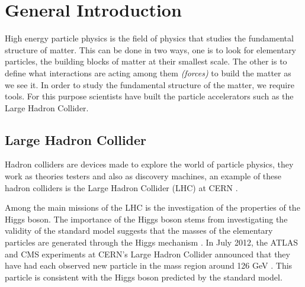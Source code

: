 \chapter{General Introduction}




High energy particle physics is the field of physics that studies the fundamental structure of matter. This can be done in two ways, one is to look for elementary particles, the building blocks of matter at their smallest scale. The other is to define what interactions are acting among them
\emph{(forces)} to build the matter as we see it. In order to study the fundamental structure of the matter, we require tools. For this purpose scientists have built the particle accelerators such as the Large Hadron Collider.



\section{Large Hadron Collider}



Hadron colliders are devices made to explore the world of particle physics, they work as theories testers 
and also as  discovery machines, an example of these hadron colliders is the Large Hadron Collider (LHC) at CERN \citep{1748-0221-3-08-S08001}.

Among the main missions of the LHC is the investigation of the properties of the Higgs boson. The importance of the Higgs boson stems from investigating the validity of the standard model suggests that the masses of the elementary particles are generated through the Higgs mechanism \citep{particle}. In July 2012, the ATLAS and CMS experiments at CERN's Large Hadron Collider announced that they have had each observed new particle in the mass region around 126 GeV \citep{Aad:2012tfa}. This particle is consistent with the Higgs boson predicted by the standard model.  

